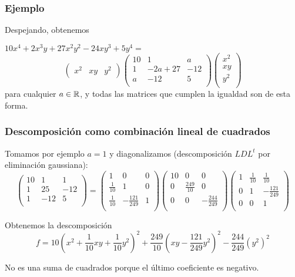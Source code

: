 \documentclass[aspectratio=169,12pt,spanish]{beamer}
\begin{document}


\begin{frame}


\frametitle{Ejemplo}

Despejando, obtenemos 

$10x^4+2x^3y+27x^2y^2-24xy^3+5y^4 = $
\[
\begin{pmatrix}
x^2 & xy & y^2
\end{pmatrix}
\begin{pmatrix}
10 & 1 & a \\
1 & -2a + 27 & -12 \\
a & -12 & 5 \\
\end{pmatrix}
\begin{pmatrix}
x^2 \\
xy \\
y^2 \\
\end{pmatrix}
\]
para cualquier $a \in \mathbb{R}$, y todas las matrices que cumplen la igualdad son de esta forma.


\end{frame}




\begin{frame}

\frametitle{Descomposición como combinación lineal de cuadrados}

Tomamos por ejemplo $a = 1$ y diagonalizamos (descomposici\'on $LDL^t$ por eliminaci\'on gaussiana):
{\scriptsize
\[
\begin{pmatrix}
10 & 1 & 1 \\
1 & 25 & -12 \\
1 & -12 & 5 \\
\end{pmatrix}
=
\begin{pmatrix}
1 & 0 & 0 \\
\frac{1}{10} & 1 & 0 \\
\frac{1}{10} & -\frac{121}{249} & 1 \\
\end{pmatrix}
\begin{pmatrix}
10 & 0 & 0 \\
0 & \frac{249}{10} & 0 \\
0 & 0 & -\frac{244}{249} \\
\end{pmatrix}
\begin{pmatrix}
1 & \frac{1}{10}  & \frac{1}{10}  \\
0 & 1 & -\frac{121}{249}  \\
0 & 0 & 1 \\
\end{pmatrix}
\]
}

Obtenemos la descomposici\'on
\[
f = 10\left(x^2+\frac{1}{10}xy+\frac{1}{10}y^2\right)^2 + \frac{249}{10}\left(xy-\frac{121}{249}y^2\right)^2 - \frac{244}{249}\left(y^2\right)^2
\]

No es una suma de cuadrados porque el último coeficiente es negativo.

\end{frame}
\end{document}
